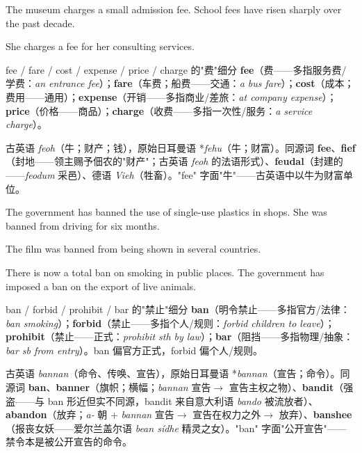 \documentclass[../main.tex]{subfiles}
\begin{document}

{The museum charges a small admission fee.}
{School fees have risen sharply over the past decade.}

{She charges a fee for her consulting services.}

\begin{lex}{fee / fare / cost / expense / price / charge 的"费"细分}
\textbf{fee}（费——多指服务费/学费：\textit{an entrance fee}）；\textbf{fare}（车费；船费——交通：\textit{a bus fare}）；\textbf{cost}（成本；费用——通用）；\textbf{expense}（开销——多指商业/差旅：\textit{at company expense}）；\textbf{price}（价格——商品）；\textbf{charge}（收费——多指一次性/服务：\textit{a service charge}）。
\end{lex}

\begin{origin}
古英语 \textit{feoh}（牛；财产；钱），原始日耳曼语 *\textit{fehu}（牛；财富）。同源词 \textbf{fee}、\textbf{fief}（封地——领主赐予佃农的"财产"；古英语 \textit{feoh} 的法语形式）、\textbf{feudal}（封建的——\textit{feodum} 采邑）、德语 \textit{Vieh}（牲畜）。"fee" 字面"牛"——古英语中以牛为财富单位。
\end{origin}


{The government has banned the use of single-use plastics in shops.}
{She was banned from driving for six months.}

{The film was banned from being shown in several countries.}

{There is now a total ban on smoking in public places.}
{The government has imposed a ban on the export of live animals.}

\begin{gram}{ban / forbid / prohibit / bar 的"禁止"细分}
\textbf{ban}（明令禁止——多指官方/法律：\textit{ban smoking}）；\textbf{forbid}（禁止——多指个人/规则：\textit{forbid children to leave}）；\textbf{prohibit}（禁止——正式：\textit{prohibit sth by law}）；\textbf{bar}（阻挡——多指物理/抽象：\textit{bar sb from entry}）。ban 偏官方正式，forbid 偏个人/规则。
\end{gram}

\begin{origin}
古英语 \textit{bannan}（命令、传唤、宣告），原始日耳曼语 *\textit{bannan}（宣告；命令）。同源词 \textbf{ban}、\textbf{banner}（旗帜；横幅；\textit{bannan} 宣告$\to$ 宣告主权之物）、\textbf{bandit}（强盗——与 ban 形近但实不同源，bandit 来自意大利语 \textit{bando} 被流放者）、\textbf{abandon}（放弃；\textit{a-} 朝 + \textit{bannan} 宣告$\to$ 宣告在权力之外$\to$ 放弃）、\textbf{banshee}（报丧女妖——爱尔兰盖尔语 \textit{bean sídhe} 精灵之女）。"ban" 字面"公开宣告"——禁令本是被公开宣告的命令。
\end{origin}
\end{document}
